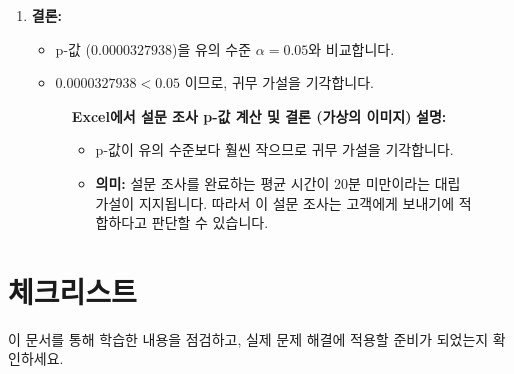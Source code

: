\documentclass[11pt,a4paper]{book}
\providecommand{\captionof}[2]{\textbf{#2}}
\theoremstyle{definition}
\begin{document}
\begin{enumerate}
    \item \textbf{결론:}
    \begin{itemize}
        \item p-값 ($0.0000327938$)을 유의 수준 $\alpha = 0.05$와 비교합니다.
        \item $0.0000327938 < 0.05$ 이므로, 귀무 가설을 기각합니다.
    \end{itemize}
    \begin{figure}[h!]
        \centering
        \captionof{figure}{Excel에서 설문 조사 p-값 계산 및 결론 (가상의 이미지)}
        \label{fig:excel_survey_p_value_conclusion}
        \vspace{0.5em}
        \textbf{설명:}
        \begin{itemize}
            \item p-값이 유의 수준보다 훨씬 작으므로 귀무 가설을 기각합니다.
            \item \textbf{의미:} 설문 조사를 완료하는 평균 시간이 20분 미만이라는 대립 가설이 지지됩니다. 따라서 이 설문 조사는 고객에게 보내기에 적합하다고 판단할 수 있습니다.
        \end{itemize}
    \end{figure}
\end{enumerate}


\section*{체크리스트}

이 문서를 통해 학습한 내용을 점검하고, 실제 문제 해결에 적용할 준비가 되었는지 확인하세요.
\end{document}
